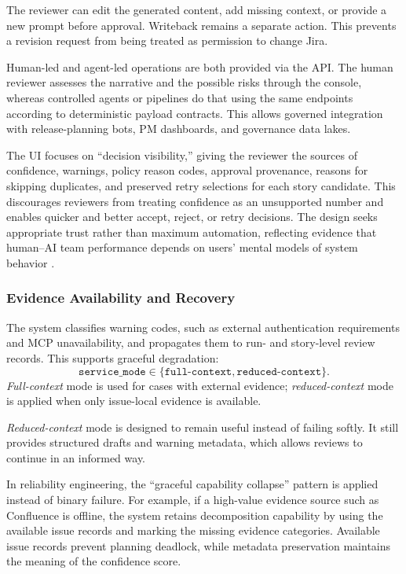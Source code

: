 \documentclass[manuscript,review]{acmart}
\begin{document}
The reviewer can edit the generated content, add missing context, or provide a new prompt before approval. Writeback remains a separate action. This prevents a revision request from being treated as permission to change Jira.

Human-led and agent-led operations are both provided via the API. The human reviewer assesses the narrative and the possible risks through the console, whereas controlled agents or pipelines do that using the same endpoints according to deterministic payload contracts. This allows governed integration with release-planning bots, PM dashboards, and governance data lakes.

The UI focuses on ``decision visibility,'' giving the reviewer the sources of confidence, warnings, policy reason codes, approval provenance, reasons for skipping duplicates, and preserved retry selections for each story candidate. This discourages reviewers from treating confidence as an unsupported number and enables quicker and better accept, reject, or retry decisions. The design seeks appropriate trust rather than maximum automation, reflecting evidence that human--AI team performance depends on users' mental models of system behavior \cite{R56,R57,R76}.

\subsubsection{Evidence Availability and Recovery}\label{sec:evidence-recovery}

The system classifies warning codes, such as external authentication requirements and MCP unavailability, and propagates them to run- and story-level review records. This supports graceful degradation:
\begin{equation}
\texttt{service\_mode} \in \{\texttt{full-context},\texttt{reduced-context}\}.
\end{equation}
\textit{Full-context} mode is used for cases with external evidence; \textit{reduced-context} mode is applied when only issue-local evidence is available.

\textit{Reduced-context} mode is designed to remain useful instead of failing softly. It still provides structured drafts and warning metadata, which allows reviews to continue in an informed way.

In reliability engineering, the ``graceful capability collapse'' pattern is applied instead of binary failure. For example, if a high-value evidence source such as Confluence is offline, the system retains decomposition capability by using the available issue records and marking the missing evidence categories. Available issue records prevent planning deadlock, while metadata preservation maintains the meaning of the confidence score.
\end{document}
